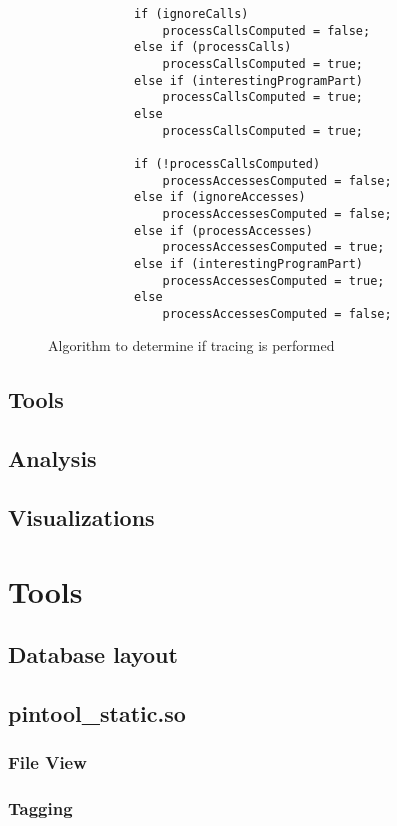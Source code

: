 \begin{figure}
	\begin{center}
		\begin{verbatim}
			if (ignoreCalls)
				processCallsComputed = false;
			else if (processCalls)
				processCallsComputed = true;
			else if (interestingProgramPart)
				processCallsComputed = true;
			else
				processCallsComputed = true;
			
			if (!processCallsComputed)
				processAccessesComputed = false;
			else if (ignoreAccesses)
				processAccessesComputed = false;
			else if (processAccesses)
				processAccessesComputed = true;
			else if (interestingProgramPart)
				processAccessesComputed = true;
			else
				processAccessesComputed = false;
		\end{verbatim}
	\end{center}
	\caption{Algorithm to determine if tracing is performed}
	\label{cap2:tracealg}
\end{figure}

\subsection{Tools}

\subsection{Analysis}
\subsection{Visualizations}

\section{Tools}

\subsection{Database layout}

\subsection{pintool\_static.so}
\subsubsection{File View}
\subsubsection{Tagging}

